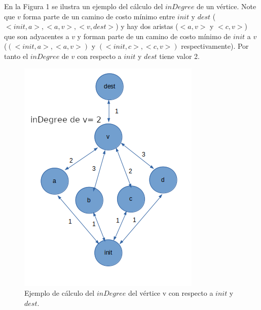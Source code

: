 \documentclass[a4paper,12pt,twocolumn]{article}
\begin{document}
	 En la Figura 1 se ilustra un ejemplo del cálculo del $inDegree$ de un vértice. Note que $v$ forma parte de un camino de costo mínimo entre $init$ y $dest$ ($<init,a>, <a, v>, <v, dest>$) y hay dos aristas ($<a,v>$ y $<c,v>$) que son adyacentes a $v$ y forman parte de un camino de costo mínimo de $init$ a $v$ ($(<init, a>, <a,v>)$ y $(<init, c>, <c, v>)$ respectivamente). Por tanto el $inDegree$ de $v$ con respecto a $init$ y $dest$ tiene valor 2.\\
	
	\begin{figure}[h!]
		\centering
		\includegraphics[width=0.9\linewidth]{Figura1}
		\caption{Ejemplo de cálculo del $inDegree$ del vértice v con respecto a $init$ y $dest$.}
		\label{fig:figura1}
	\end{figure}
	
\end{document}
